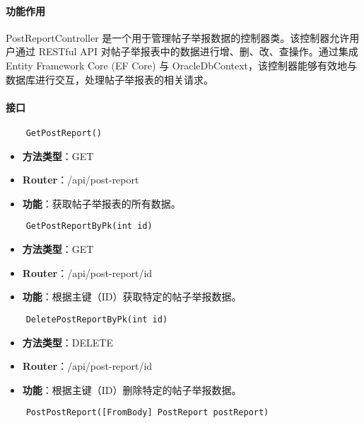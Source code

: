 \paragraph{功能作用}

PostReportController 是一个用于管理帖子举报数据的控制器类。该控制器允许用户通过 RESTful API 对帖子举报表中的数据进行增、删、改、查操作。通过集成 Entity Framework Core (EF Core) 与 OracleDbContext，该控制器能够有效地与数据库进行交互，处理帖子举报表的相关请求。

\paragraph{接口}

\begin{verbatim}
	GetPostReport()
\end{verbatim}

\begin{itemize}
	\item \textbf{方法类型}：GET
	\item \textbf{Router}：/api/post-report
	\item \textbf{功能}：获取帖子举报表的所有数据。
\end{itemize}

\begin{verbatim}
	GetPostReportByPk(int id)
\end{verbatim}

\begin{itemize}
	\item \textbf{方法类型}：GET
	\item \textbf{Router}：/api/post-report/{id}
	\item \textbf{功能}：根据主键（ID）获取特定的帖子举报数据。
\end{itemize}

\begin{verbatim}
	DeletePostReportByPk(int id)
\end{verbatim}

\begin{itemize}
	\item \textbf{方法类型}：DELETE
	\item \textbf{Router}：/api/post-report/{id}
	\item \textbf{功能}：根据主键（ID）删除特定的帖子举报数据。
\end{itemize}

\begin{verbatim}
	PostPostReport([FromBody] PostReport postReport)
\end{verbatim}

